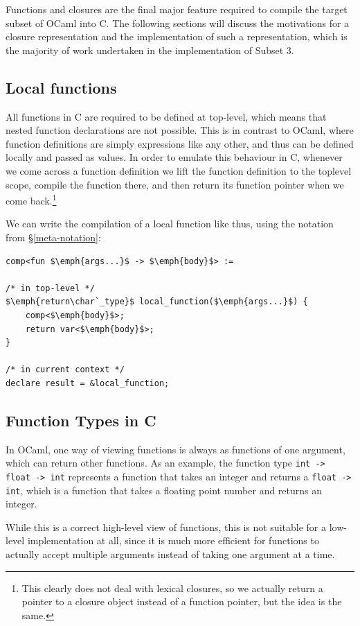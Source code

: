 \documentclass[12pt,a4paper,twoside,openright]{report}
\begin{document}
Functions and closures are the final major feature required to compile the
target subset of OCaml into C. The following sections will discuss the
motivations for a closure representation and the implementation of such a
representation, which is the majority of work undertaken in the implementation
of Subset 3.

\subsection{Local functions}

All functions in C are required to be defined at top-level, which means that 
nested function declarations are not possible. This is in contrast to OCaml, 
where function definitions are simply expressions like any other, and thus can 
be defined locally and passed as values. In order to emulate this behaviour in 
C, whenever we come across a function definition we lift the function 
definition to the toplevel scope, compile the function there, and then return 
its function pointer when we come back.\footnote{This clearly does not deal 
with lexical closures, so we actually return a pointer to a closure object 
instead of a function pointer, but the idea is the same.}

We can write the compilation of a local function like thus, using the notation
from \S\ref{meta-notation}:

\begin{lstlisting}
comp<fun $\emph{args...}$ -> $\emph{body}$> :=

/* in top-level */
$\emph{return\char`_type}$ local_function($\emph{args...}$) {
    comp<$\emph{body}$>;
    return var<$\emph{body}$>;
}

/* in current context */
declare result = &local_function;
\end{lstlisting}

\subsection{Function Types in C} \label{function-typing}

In OCaml, one way of viewing functions is always as functions of one argument,
which can return other functions. As an example, the function type \texttt{int
-> float -> int} represents a function that takes an integer and returns a
\texttt{float -> int}, which is a function that takes a floating point number
and returns an integer.

While this is a correct high-level view of functions, this is not suitable for a
low-level implementation at all, since it is much more efficient for functions
to actually accept multiple arguments instead of taking one argument at a time.
\end{document}
